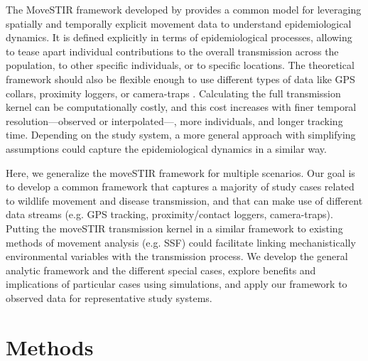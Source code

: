 \documentclass[letterpaper]{article}
\begin{document}
The MoveSTIR framework developed by \citet{Wilber2022} provides a common model for leveraging spatially and temporally explicit movement data to understand epidemiological dynamics. It is defined explicitly in terms of epidemiological processes, allowing to tease apart individual contributions to the overall transmission across the population, to other specific individuals, or to specific locations. The theoretical framework should also be flexible enough to use different types of data like GPS collars, proximity loggers, or camera-traps \citep{Wilber2022}. 
Calculating the full transmission kernel can be computationally costly, and this cost increases with finer temporal resolution—observed or interpolated—, more individuals, and longer tracking time. Depending on the study system, a more general approach with simplifying assumptions could capture the epidemiological dynamics in a similar way. 



Here, we generalize the moveSTIR framework for multiple scenarios. Our goal is to develop a common framework that captures a majority of study cases related to wildlife movement and disease transmission, and that can make use of different data streams (e.g. GPS tracking, proximity/contact loggers, camera-traps). Putting the moveSTIR transmission kernel in a similar framework to existing methods of movement analysis (e.g. SSF) could facilitate linking mechanistically environmental variables with the transmission process. We develop the general analytic framework and the different special cases, explore benefits and implications of particular cases using simulations, and apply our framework to observed data for representative study systems.

\section*{Methods}
\end{document}
